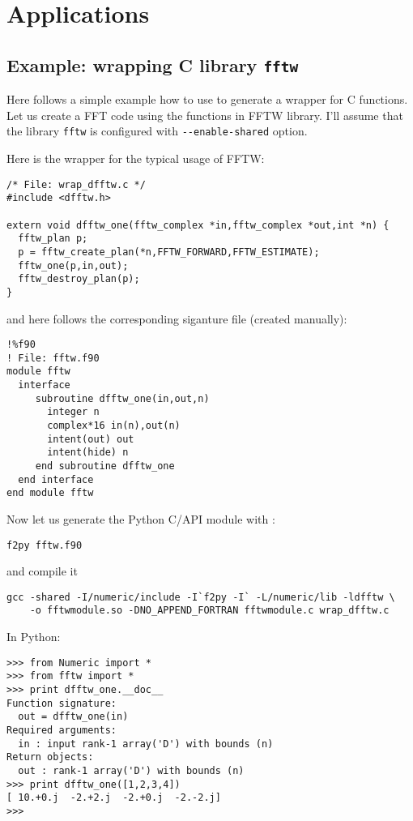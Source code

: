 
\section{Applications}
\label{sec:apps}


\subsection{Example: wrapping C library \texttt{fftw}}
\label{sec:wrapfftw}

Here follows a simple example how to use \fpy to generate a wrapper
for C functions. Let us create a FFT code using the functions in FFTW
library. I'll assume that the library \texttt{fftw} is configured with
\texttt{-{}-enable-shared} option. 

Here is the wrapper for the typical usage of FFTW:
\begin{verbatim}
/* File: wrap_dfftw.c */
#include <dfftw.h>

extern void dfftw_one(fftw_complex *in,fftw_complex *out,int *n) {
  fftw_plan p;
  p = fftw_create_plan(*n,FFTW_FORWARD,FFTW_ESTIMATE);
  fftw_one(p,in,out);
  fftw_destroy_plan(p);
}
\end{verbatim}
and here follows the corresponding siganture file (created manually):
\begin{verbatim}
!%f90
! File: fftw.f90
module fftw
  interface
     subroutine dfftw_one(in,out,n)
       integer n
       complex*16 in(n),out(n)
       intent(out) out
       intent(hide) n
     end subroutine dfftw_one
  end interface
end module fftw
\end{verbatim}

Now let us generate the Python C/API module with \fpy:
\begin{verbatim}
f2py fftw.f90
\end{verbatim}
and compile it
\begin{verbatim}
gcc -shared -I/numeric/include -I`f2py -I` -L/numeric/lib -ldfftw \
    -o fftwmodule.so -DNO_APPEND_FORTRAN fftwmodule.c wrap_dfftw.c
\end{verbatim}

In Python:
\begin{verbatim}
>>> from Numeric import *
>>> from fftw import *
>>> print dfftw_one.__doc__
Function signature:
  out = dfftw_one(in)
Required arguments:
  in : input rank-1 array('D') with bounds (n)
Return objects:
  out : rank-1 array('D') with bounds (n)
>>> print dfftw_one([1,2,3,4])
[ 10.+0.j  -2.+2.j  -2.+0.j  -2.-2.j]
>>> 
\end{verbatim}


